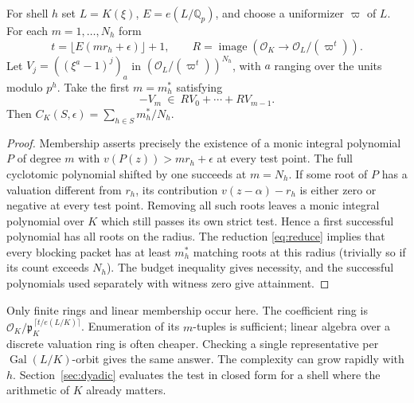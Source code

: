 \begin{proposition}\label{prop:mod}
For shell $h$ set $L=K(\xi)$, $E=e(L/\mathbb Q_p)$, and choose a uniformizer $\varpi$ of $L$. For each $m=1,\ldots,N_h$ form
\[
 t=\big\lfloor E(mr_h+\epsilon)\big\rfloor+1,\qquad
 R=\operatorname{image}(\mathcal O_K\longrightarrow\mathcal O_L/(\varpi^t)).
\]
Let $V_j=((\xi^a-1)^j)_a$ in $(\mathcal O_L/(\varpi^t))^{N_h}$, with $a$ ranging over the units modulo $p^h$. Take the first $m=m_h^*$ satisfying
\[
                 -V_m\ \in\ R V_0+\cdots+R V_{m-1}.
\]
Then $C_K(S,\epsilon)=\sum_{h\in S}m_h^*/N_h$.
\end{proposition}
\begin{proof}
Membership asserts precisely the existence of a monic integral polynomial $P$ of degree $m$ with $v(P(z))>mr_h+\epsilon$ at every test point. The full cyclotomic polynomial shifted by one succeeds at $m=N_h$. If some root of $P$ has a valuation different from $r_h$, its contribution $v(z-\alpha)-r_h$ is either zero or negative at every test point. Removing all such roots leaves a monic integral polynomial over $K$ which still passes its own strict test. Hence a first successful polynomial has all roots on the radius. The reduction \eqref{eq:reduce} implies that every blocking packet has at least $m_h^*$ matching roots at this radius (trivially so if its count exceeds $N_h$). The budget inequality gives necessity, and the successful polynomials used separately with witness zero give attainment.
\end{proof}
Only finite rings and linear membership occur here. The coefficient ring is $\mathcal O_K/\mathfrak p_K^{\,\lceil t/e(L/K)\rceil}$. Enumeration of its $m$-tuples is sufficient; linear algebra over a discrete valuation ring is often cheaper. Checking a single representative per $\operatorname{Gal}(L/K)$-orbit gives the same answer. The complexity can grow rapidly with $h$. Section~\ref{sec:dyadic} evaluates the test in closed form for a shell where the arithmetic of $K$ already matters.

